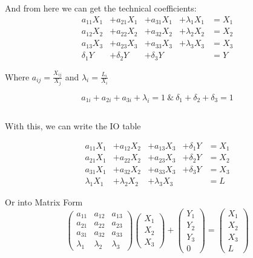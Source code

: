 \documentclass[
  letterpaper,
  DIV=11,
  numbers=noendperiod]{scrartcl}
\begin{document}
And from here we can get the technical coefficients: \[
\begin{aligned}
a_{11} X_1 &+ a_{21} X_1 &+ a_{31} X_1 &+ \lambda_{1} X_1 &= X_1 \\
a_{12} X_2 &+ a_{22} X_2 &+ a_{32} X_2 &+ \lambda_{2} X_2 &= X_2 \\
a_{13} X_3 &+ a_{23} X_3 &+ a_{33} X_3 &+ \lambda_{3} X_3 &= X_3 \\
\delta_1 Y &+ \delta_2 Y & + \delta_3 Y &  &= Y 
\end{aligned}
\]

Where \(a_{ij} = \frac{X_{ij}}{X_j}\) and
\(\lambda_i = \frac{L_i}{X_i}\)

\[a_{1i}+a_{2i}+a_{3i}+\lambda_i = 1 \ \& \ \delta_1+\delta_2+\delta_3 =1\]

\subsection{}\label{section-3}

With this, we can write the IO table

\[
\begin{aligned}
a_{11} X_1 &+ a_{12} X_2 &+ a_{13} X_3  &+ \delta_1 Y &= X_{1} \\
a_{21} X_1 &+ a_{22} X_2 &+ a_{23} X_3  &+ \delta_2 Y &= X_{2} \\
a_{31} X_1 &+ a_{32} X_2 &+ a_{33} X_3  &+ \delta_3 Y &= X_{3} \\
\lambda_1 X_1 &+ \lambda_2 X_2 &+ \lambda_3 X_3 &\ \ &= L 
\end{aligned} 
\]

Or into Matrix Form \[
\begin{pmatrix}
a_{11} & a_{12} & a_{13}  \\
a_{21} & a_{22} & a_{23} \\
a_{31} & a_{32} & a_{33} \\
\lambda_1 & \lambda_2 & \lambda_3 
\end{pmatrix}
\begin{pmatrix}
X_1 \\ X_2 \\ X_3 
\end{pmatrix} + 
\begin{pmatrix}
Y_1 \\ Y_2 \\ Y_3 \\ 0
\end{pmatrix}=
\begin{pmatrix}
X_1 \\ X_2 \\ X_3 \\ L
\end{pmatrix}
\]
\end{document}

